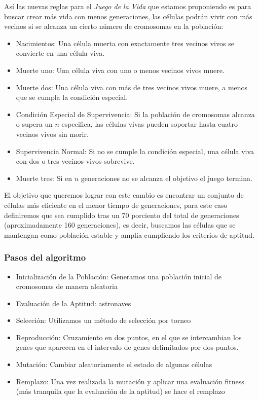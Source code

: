 Así las nuevas reglas para el \textit{Juego de la Vida} que estamos proponiendo es para 
buscar crear más vida con menos generaciones, las células  podrán vivir con más vecinos 
si se alcanza un cierto número de cromosomas en la población:

\begin{itemize}
    \item Nacimientos: Una célula muerta con exactamente tres vecinos vivos se convierte 
    en una célula viva.
    \item Muerte uno: Una célula viva con uno o menos vecinos vivos muere.
    \item Muerte dos: Una célula viva con más de tres vecinos vivos muere, a menos que se 
    cumpla la condición especial.
    \item Condición Especial de Supervivencia: Si la población de cromosomas alcanza o 
    supera un $n$ especifica, las células vivas pueden soportar hasta cuatro 
    vecinos vivos sin morir.
    \item Supervivencia Normal: Si no se cumple la condición especial, una célula viva con 
    dos o tres vecinos vivos sobrevive.
    \item Muerte tres: Si en $n$ generaciones no se alcanza el objetivo el juego termina.
\end{itemize}

El objetivo que queremos lograr con este cambio es encontrar un conjunto de células más eficiente
en el menor tiempo de generaciones, para este caso definiremos que sea cumplido tras un 
70 porciento del total de generaciones (aproximadamente 160 generaciones), es decir, buscamos 
las células que se mantengan como población estable y amplia cumpliendo los criterios de aptitud.

\subsubsection*{Pasos del algoritmo}

\begin{itemize}
    \item Inicialización de la Población: Generamos una población inicial de cromosomas de 
    manera aleatoria
    \item Evaluación de la Aptitud: astronaves
    \item Selección: Utilizamos un método de selección por torneo
    \item Reproducción: Cruzamiento en dos puntos, en el que se intercambian los genes que 
    aparecen en el intervalo de genes delimitados por dos puntos.
    \item Mutación: Cambiar aleatoriamente el estado de algunas células
    \item Remplazo: Una vez realizada la mutación y aplicar una evaluación fitness (más 
    tranquila que la evaluación de la aptitud) se hace el remplazo
\end{itemize}


